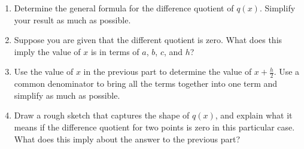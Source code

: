 \begin{enumerate}
  \begin{enumerate}
  \item Determine the general formula for the difference quotient of
    $q(x)$. Simplify your result as much as possible.
  \item Suppose you are given that the different quotient is
    zero. What does this imply the value of $x$ is in terms of $a$,
    $b$, $c$, and $h$?
  \item Use the value of $x$ in the previous part to determine the
    value of $x+\frac{h}{2}$. Use a common denominator to bring all
    the terms together into one term and simplify as much as possible.
  \item Draw a rough sketch that captures the shape of $q(x)$, and
    explain what it means if the difference quotient for two points is
    zero in this particular case. What does this imply about the
    answer to the previous part?
  \end{enumerate}

\end{enumerate}

